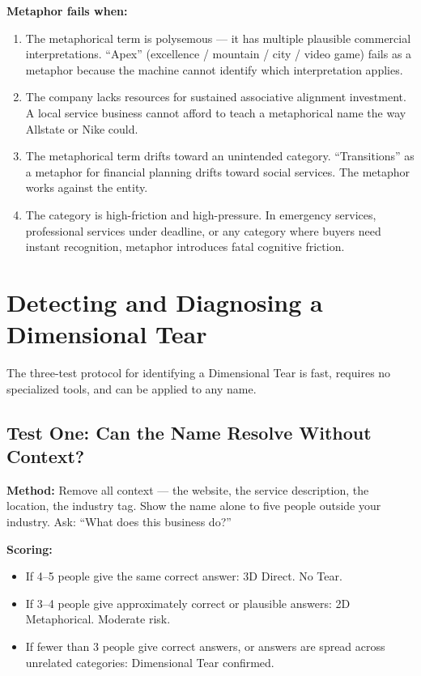 \documentclass[12pt, openany]{book}
\theoremstyle{thmstyle}
\theoremstyle{defstyle}
\begin{document}
\textbf{Metaphor fails when:}
\begin{enumerate}[leftmargin=1.5em]
  \item The metaphorical term is polysemous --- it has multiple plausible commercial interpretations. ``Apex'' (excellence / mountain / city / video game) fails as a metaphor because the machine cannot identify which interpretation applies.
  \item The company lacks resources for sustained associative alignment investment. A local service business cannot afford to teach a metaphorical name the way Allstate or Nike could.
  \item The metaphorical term drifts toward an unintended category. ``Transitions'' as a metaphor for financial planning drifts toward social services. The metaphor works against the entity.
  \item The category is high-friction and high-pressure. In emergency services, professional services under deadline, or any category where buyers need instant recognition, metaphor introduces fatal cognitive friction.
\end{enumerate}

\section{Detecting and Diagnosing a Dimensional Tear}

The three-test protocol for identifying a Dimensional Tear is fast, requires no specialized tools, and can be applied to any name.

\subsection{Test One: Can the Name Resolve Without Context?}

\textbf{Method:} Remove all context --- the website, the service description, the location, the industry tag. Show the name alone to five people outside your industry. Ask: ``What does this business do?''

\textbf{Scoring:}
\begin{itemize}[leftmargin=1.5em]
  \item If 4--5 people give the same correct answer: 3D Direct. No Tear.
  \item If 3--4 people give approximately correct or plausible answers: 2D Metaphorical. Moderate risk.
  \item If fewer than 3 people give correct answers, or answers are spread across unrelated categories: Dimensional Tear confirmed.
\end{itemize}
\end{document}
